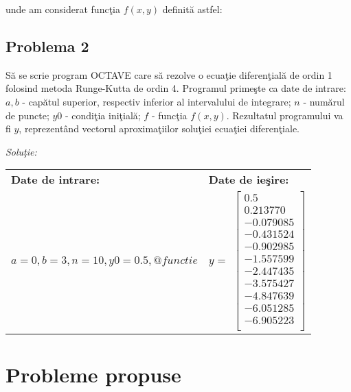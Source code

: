 \documentclass{exam}
\newcommand{\octavescript}[2]{
	
}
\begin{document}
unde am considerat funcţia $f(x,y)$ definită astfel:
\octavescript{./src/functie.m}{Exemplu de funcţie de integrat.}


\subsection{Problema 2}
Să se scrie program OCTAVE care să rezolve o ecuaţie diferenţială de ordin 1 folosind metoda Runge-Kutta de ordin 4. Programul primeşte ca date de intrare: $a, b$ - capătul superior, respectiv inferior al intervalului de integrare; $n$ - numărul de puncte;  $y0$ - condiţia iniţială; $f$ - funcţia $f(x,y)$. Rezultatul programului va fi $y$, reprezentând vectorul aproximaţiilor soluţiei ecuaţiei diferenţiale.

\textit{Soluţie:}

\octavescript{./src/Runge_Kutta4.m}{Metoda Runge-Kutta de ordin 4.}

\begin{center}
	\begin{tabular}{| l | l |}
		\hline
		\textbf{Date de intrare:}                   & \textbf{Date de ieşire:} \\
		$a = 0, b = 3, n = 10, y0 = 0.5,  @functie$ &
		$y = $
		$
			\begin{bmatrix}
				0.5       \\
				0.213770  \\
				-0.079085 \\
				-0.431524 \\
				-0.902985 \\
				-1.557599 \\
				-2.447435 \\
				-3.575427 \\
				-4.847639 \\
				-6.051285 \\
				-6.905223 \\
			\end{bmatrix}
		$
		\\
		\hline
	\end{tabular}
\end{center}


\section{Probleme propuse}
\end{document}
